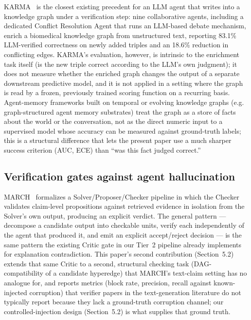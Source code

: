 \documentclass[review,12pt]{elsarticle}
\begin{document}
KARMA~\cite{lu2025karma} is the closest existing precedent for an LLM
agent that writes into a knowledge graph under a verification step: nine
collaborative agents, including a dedicated Conflict Resolution Agent
that runs an LLM-based debate mechanism, enrich a biomedical knowledge
graph from unstructured text, reporting 83.1\% LLM-verified correctness
on newly added triples and an 18.6\% reduction in conflicting edges.
KARMA's evaluation, however, is intrinsic to the enrichment task itself
(is the new triple correct according to the LLM's own judgment); it does
not measure whether the enriched graph changes the output of a separate
downstream predictive model, and it is not applied in a setting where the
graph is read by a frozen, previously trained scoring function on a
recurring basis. Agent-memory frameworks built on temporal or evolving
knowledge graphs (e.g. graph-structured agent memory substrates) treat
the graph as a store of facts about the world or the conversation, not as
the direct numeric input to a supervised model whose accuracy can be
measured against ground-truth labels; this is a structural difference
that lets the present paper use a much sharper success criterion (AUC,
ECE) than ``was this fact judged correct.''

\subsection{Verification gates against agent hallucination}

MARCH~\cite{li2026march} formalizes a Solver/Proposer/Checker pipeline in
which the Checker validates claim-level propositions against retrieved
evidence in isolation from the Solver's own output, producing an
explicit verdict. The general pattern --- decompose a candidate output
into checkable units, verify each independently of the agent that
produced it, and emit an explicit accept/reject decision --- is the same
pattern the existing Critic gate in our Tier~2 pipeline already
implements for explanation contradiction. This paper's second
contribution (Section~5.2) extends that same Critic to a second,
structural checking task (DAG-compatibility of a candidate hyperedge)
that MARCH's text-claim setting has no analogue for, and reports metrics
(block rate, precision, recall against known-injected corruption) that
verifier papers in the text-generation literature do not typically
report because they lack a ground-truth corruption channel; our
controlled-injection design (Section~5.2) is what supplies that ground
truth.
\end{document}
